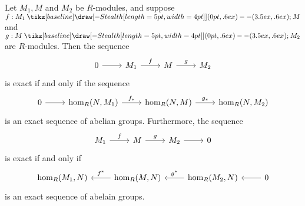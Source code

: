 \documentclass[12pt,letterpaper]{algebra_book}
\renewcommand{\to}{\mathbin{\tikz[baseline] \draw[-{Stealth[length=5pt,width=4pt]}] (0pt,.6ex) -- (3.5ex,.6ex);}}
\theoremstyle{definition}
\begin{document}
\begin{thm}
    Let $M_1, M$ and $M_2$ be $R$-modules, and suppose $f:M_1 \to
    M$ and $g:M \to M_2$ are $R$-modules. Then the sequence
    \begin{equation}\label{0_M_1MM_2_short_exact}
        \begin{tikzcd}
            0 \arrow[r]
            &
            M_{1} \arrow[r, "f"]
            &
            M \arrow[r, "g"]
            &
            M_{2}
        \end{tikzcd}
    \end{equation}
    is exact if and only if the sequence 
        \begin{equation} \label{0_homM1_homM_homM2_exact_sequence}
        \begin{tikzcd}
            0 \arrow[r]
            &
            \hom_R(N,M_{1}) \arrow[r, "f_*"]
            &
            \hom_R(N, M) \arrow[r, "g_*"]
            &
            \hom_R(N,M_{2})
        \end{tikzcd}
    \end{equation}
    is an exact sequence of abelian groups. Furthermore, the sequence 
    \begin{equation}\label{M_1MM_2_0_short_exact}
        \begin{tikzcd}
            M_{1} \arrow[r, "f"]
            &
            M \arrow[r, "g"]
            &
            M_{2} \arrow[r]
            &
            0
        \end{tikzcd}
    \end{equation}
    is exact if and only if 
    \begin{equation}\label{homM1_homM_homM2_0_exact_sequence}
        \begin{tikzcd}
            \hom_R(M_{1}, N)
            &
            \hom_R(M, N) \arrow[l, swap, "f^*"]
            &
            \hom_R(M_{2}, N)\arrow[l, swap, "g^*"]
            & 
            0 \arrow[l]
        \end{tikzcd}
    \end{equation}
    is an exact sequence of abelain groups.
\end{thm}
\end{document}
